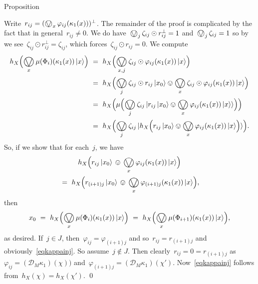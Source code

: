 \documentclass[b]{subfiles}
\begin{document}
\begin{parsec}
\begin{point}[aconvalmosteffectus]{Proposition}
\begin{point}
Write~$r_{ij} = (\bigovee_x \varphi_{ij}(\kappa_1(x)))^\perp$.
The remainder of the proof is complicated
    by the fact that in general~$r_{ij} \neq 0$.
    We do have~$\bigovee_j \zeta_{ij} \odot r^\perp_{ij} = 1$
        and~$\bigovee_j \zeta_{ij} = 1$
        so by 
        we see~$\zeta_{ij} \odot r^\perp_{ij} = \zeta_{ij}$,
        which  forces~$\zeta_{ij} \odot r_{ij} = 0$.
We compute
\begin{align*}
    h_X\Bigl(\bigovee_x \mu(\Phi_i) (\kappa_1(x)) \ket{x}\Bigr) 
    &\ = \ 
    h_X \Bigl( \bigovee_{x,j} \zeta_{ij} \odot \varphi_{ij}
        (\kappa_1(x)) \ket{x} \Bigr) \\
        &\ = \ 
    h_X \Bigl(
    \bigovee_{j} \zeta_{ij} \odot r_{ij} \ket{x_0} \ovee \bigovee_x
    \zeta_{ij} \odot \varphi_{ij}
        (\kappa_1(x)) \ket{x} \Bigr) \\
        & \ = \ h_X \Bigl(
    \mu\Bigl( \bigovee_j \zeta_{ij} \ket{
        r_{ij} \ket{x_0} \ovee \bigovee_x \varphi_{ij} (\kappa_1 (x)) \ket{x}
    }
    \Bigr)
    \Bigr) \\
        & \ = \ h_X \Bigl(
    \bigovee_j \zeta_{ij} \ket{
        h_X\Bigl(
        r_{ij} \ket{x_0} \ovee \bigovee_x \varphi_{ij} (\kappa_1 (x)) \ket{x}
    \Bigr)
}
    \Bigr).
\end{align*}
So, if we show that for each~$j$,
    we have
\begin{multline}\label{eqkappainj}
        h_X\Bigl(
        r_{ij} \ket{x_0} \, \ovee \,\bigovee_x \varphi_{ij} (\kappa_1 (x)) \ket{x}
    \Bigr) \\
    \  = \  
        h_X\Bigl(
        r_{(i+1)j} \ket{x_0} \,\ovee \,\bigovee_x \varphi_{(i+1)j} (\kappa_1 (x)) \ket{x}
    \Bigr),
\end{multline}
then
\begin{equation*}
    x_0 \ = \ h_X\Bigl(\bigovee_x \mu(\Phi_i) (\kappa_1(x)) \ket{x}\Bigr) 
    \ =\  h_X\Bigl(\bigovee_x \mu(\Phi_{i+1}) (\kappa_1(x)) \ket{x}\Bigr),
\end{equation*}
as desired.
If~$j \in J$,
then~$\varphi_{ij} = \varphi_{(i+1)j}$
and so~$r_{ij} = r_{(i+1)j}$
and obviously~\eqref{eqkappainj}.
So assume~$j \notin J$.
Then clearly~$r_{ij} = 0 = r_{(i+1)j}$
as~$\varphi_{ij} = (\mathcal{D}_M \kappa_1)(\chi))$
    and~$\varphi_{(i+1)j} = (\mathcal{D}_M \kappa_1) (\chi')$.
Now~\eqref{eqkappainj} follows from~$h_X(\chi) = h_X(\chi')$. \qed
\end{point}
\end{point}
\end{parsec}
\end{document}
